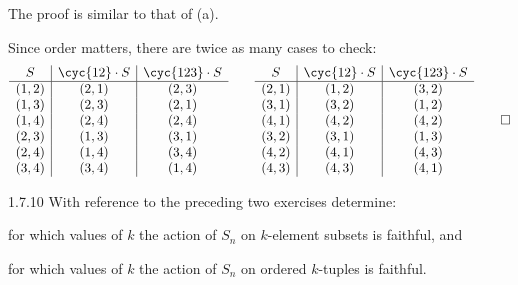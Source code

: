 \begin{solenum}
    \item The proof is similar to that of (a).
    \item Since order matters, there are twice as many cases to check:
    \[
        \begin{array}{*{2}{c|}c}
            S & \cyc{1 2} \cdot S & \cyc{1 2 3} \cdot S \\
            \hline
            (1, 2) & (2, 1) & (2, 3) \\
            (1, 3) & (2, 3) & (2, 1) \\
            (1, 4) & (2, 4) & (2, 4) \\
            (2, 3) & (1, 3) & (3, 1) \\
            (2, 4) & (1, 4) & (3, 4) \\
            (3, 4) & (3, 4) & (1, 4)
        \end{array} \qquad
        \begin{array}{*{2}{c|}c}
            S & \cyc{1 2} \cdot S & \cyc{1 2 3} \cdot S \\
            \hline
            (2, 1) & (1, 2) & (3, 2) \\
            (3, 1) & (3, 2) & (1, 2) \\
            (4, 1) & (4, 2) & (4, 2) \\
            (3, 2) & (3, 1) & (1, 3) \\
            (4, 2) & (4, 1) & (4, 3) \\
            (4, 3) & (4, 3) & (4, 1)
        \end{array} \qedhere
    \]
\end{solenum}

\begin{exercise}{1.7.10}
    With reference to the preceding two exercises determine:
    \begin{subexercises}
        \item for which values of $k$ the action of $S_n$ on $k$-element subsets is faithful, and
        \item for which values of $k$ the action of $S_n$ on ordered $k$-tuples is faithful.
    \end{subexercises}
\end{exercise}

